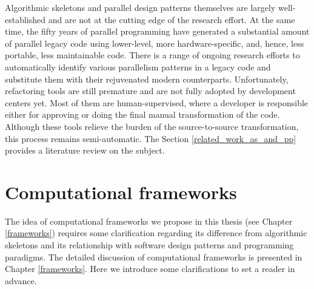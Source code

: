 \quad Algorithmic skeletons and parallel design patterns themselves are largely well-established and are not at the cutting edge of the research effort. At the same time, the fifty years of parallel programming have generated a substantial amount of parallel legacy code using lower-level, more hardware-specific, and, hence, less portable, less maintainable code. There is a range of ongoing research efforts to automatically identify various parallelism patterns in a legacy code and substitute them with their rejuvenated modern counterparts. Unfortunately, refactoring tools are still premature and are not fully adopted by development centers yet. Most of them are human-supervised, where a developer is responsible either for approving or doing the final manual transformation of the code. Although these tools relieve the burden of the source-to-source transformation, this process remains semi-automatic. The Section \ref{related_work_as_and_pp} provides a literature review on the subject.\newline\null
\section{Computational frameworks}
\label{background_frameworks_vs_skeletons}
\quad The idea of computational frameworks we propose in this thesis (see Chapter \ref{frameworks}) requires some clarification regarding its difference from algorithmic skeletons and its relationship with software design patterns and programming paradigms. The detailed discussion of computational frameworks is presented in Chapter \ref{frameworks}. Here we introduce some clarifications to set a reader in advance.  
